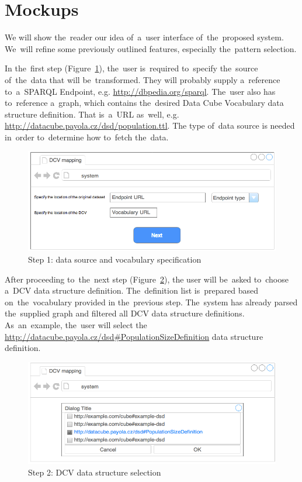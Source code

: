 \section{Mockups}
\FloatBarrier
We will show the~reader our idea of~a~user interface of~the~proposed system. We~will refine some previously outlined features, especially the~pattern selection.

In the~first step (Figure~\ref{fig:mockup-01}), the~user is~required to~specify the~source of~the~data that 
will be~transformed. They will probably supply a~reference to~a~SPARQL Endpoint,
e.g. \url{http://dbpedia.org/sparql}. The~user also has to~reference a~graph, which contains the~desired Data Cube Vocabulary data structure definition.
That is~a~URL as~well, e.g. \url{http://datacube.payola.cz/dsd/population.ttl}.
The type of~data source 
is needed in~order to~determine how to~fetch the~data.
\begin{figure}
	\centering
	\includegraphics[width=120mm]{img/mockup-01.png}
	\caption{Step 1: data source and vocabulary specification}
	\label{fig:mockup-01}
\end{figure}

After proceeding to~the~next step (Figure~\ref{fig:mockup-02}),
the user will be~asked to~choose a~DCV data 
structure definition. The~definition list is~prepared based on~the~vocabulary provided 
in the~previous step. The~system has already parsed the~supplied graph and filtered all
DCV data structure definitions. As~an~example, the~user will select the
\url{http://datacube.payola.cz/dsd#PopulationSizeDefinition} data structure definition.

\begin{figure}
	\centering
	\includegraphics[width=120mm]{img/mockup-02.png}
	\caption{Step 2: DCV data structure selection}
	\label{fig:mockup-02}
\end{figure}

